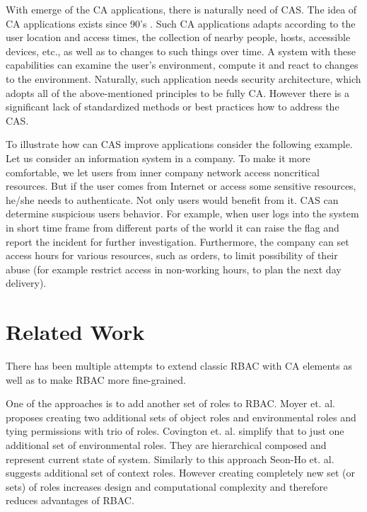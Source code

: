 \documentclass{poster15}
\begin{document}
With emerge of the CA applications, there is naturally need of CAS. The idea of CA applications exists since 90's \cite{contextaware}. Such CA applications adapts according to the user location and access times, the collection of nearby people, hosts, accessible devices, etc., as well as to changes to such things over time. A system with these capabilities can examine the user's environment, compute it and react to changes to the environment. Naturally, such application needs security architecture, which adopts all of the above-mentioned principles to be fully CA. However there is a significant lack of standardized methods or best practices how to address the CAS.

To illustrate how can CAS improve applications consider the following example. Let us consider an information system in a company. To make it more comfortable, we let users from inner company network access noncritical resources. But if the user comes from Internet or access some sensitive resources, he/she needs to authenticate. Not only users would benefit from it. CAS can determine suspicious users behavior. For example, when user logs into the system in short time frame from different parts of the world it can raise the flag and report the incident for further investigation. Furthermore, the company can set access hours for various resources, such as orders, to limit possibility of their abuse (for example restrict access in non-working hours, to plan the next day delivery).

\section{Related Work}

There has been multiple attempts to extend classic RBAC with CA elements as well as to make RBAC more fine-grained.

One of the approaches is to add another set of roles to RBAC. Moyer et. al. \cite{grbac} proposes creating two additional sets of object roles and environmental roles and tying permissions with trio of roles. Covington et. al. \cite{envroles} simplify that to just one additional set of environmental roles. They are hierarchical composed and represent current state of system. Similarly to this approach Seon-Ho et. al. \cite{contextroles} suggests additional set of context roles. However creating completely new set (or sets) of roles increases design and computational complexity and therefore reduces advantages of RBAC.
\end{document}
